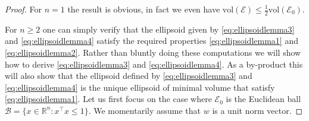 \documentclass[openany]{now}
\newcommand{\R}{\mathbb{R}}
\newcommand{\cB}{\mathcal{B}}
\begin{document}
\begin{proof}
For $n=1$ the result is obvious, in fact we even have $\mathrm{vol}(\mathcal{E}) \leq \frac12 \mathrm{vol}(\mathcal{E}_0) .$

For $n \geq 2$ one can simply verify that the ellipsoid given by \eqref{eq:ellipsoidlemma3} and \eqref{eq:ellipsoidlemma4} satisfy the required properties \eqref{eq:ellipsoidlemma1} and \eqref{eq:ellipsoidlemma2}. Rather than bluntly doing these computations we will show how to derive \eqref{eq:ellipsoidlemma3} and \eqref{eq:ellipsoidlemma4}. As a by-product this will also show that the ellipsoid defined by \eqref{eq:ellipsoidlemma3} and \eqref{eq:ellipsoidlemma4} is the unique ellipsoid of minimal volume that satisfy \eqref{eq:ellipsoidlemma1}. Let us first focus on the case where $\mathcal{E}_0$ is the Euclidean ball $\cB = \{x \in \R^n : x^{\top} x \leq 1\}$. We momentarily assume that $w$ is a unit norm vector. 


\end{proof}
\end{document}
